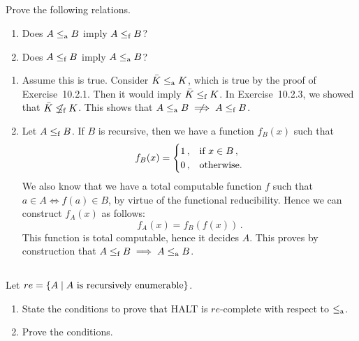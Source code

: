 \subsection{} %
Prove the following relations.
\begin{enumerate}
	\item Does \(A \le_\textnormal{a} B\) imply \(A \le_\textnormal{f} B\)?
	\item Does \(A \le_\textnormal{f} B\) imply \(A \le_\textnormal{a} B\)?
\end{enumerate}

\begin{solution}
	\begin{enumerate}
		\item Assume this is true.
		Consider \(\bar{K} \le_\textnormal{a} K\),
		which is true by the proof of Exercise~10.2.1.
		Then it would imply \(\bar{K} \le_\textnormal{f} K\).
		In Exercise~10.2.3,
		we showed that \(\bar{K} \centernot\fred K\).
		This shows that \(A \ared B \centernot\implies A \fred B\).
		\item Let \(A \le_\textnormal{f} B\).
		If \(B\) is recursive,
		then we have a function \(f_B(x)\) such that
		\[
		f_B(x) = \begin{cases} 1\,, & \textnormal{if } x\in B\,,\\ 0\,, & \textnormal{otherwise.}\end{cases}
		\]
		We also know that we have a total computable function \(f\)
		such that \(a \in A \iff f(a) \in B\),
		by virtue of the functional reducibility.
		Hence we can construct \(f_A(x)\) as follows:
		\[
		f_A(x) = f_B(f(x))\,.
		\]
		This function is total computable,
		hence it decides \(A\).
		This proves by construction that
		\(A \le_\textnormal{f} B \implies A \le_\textnormal{a} B\).
	\end{enumerate}
\end{solution}

\subsection{} %
Let \(re = \{A \mid A \textnormal{ is recursively enumerable}\}\).
\begin{enumerate}
	\item State the conditions to prove that HALT is \(re\)-complete
	with respect to \(\le_\textnormal{a}\).
	\item Prove the conditions.
\end{enumerate}

